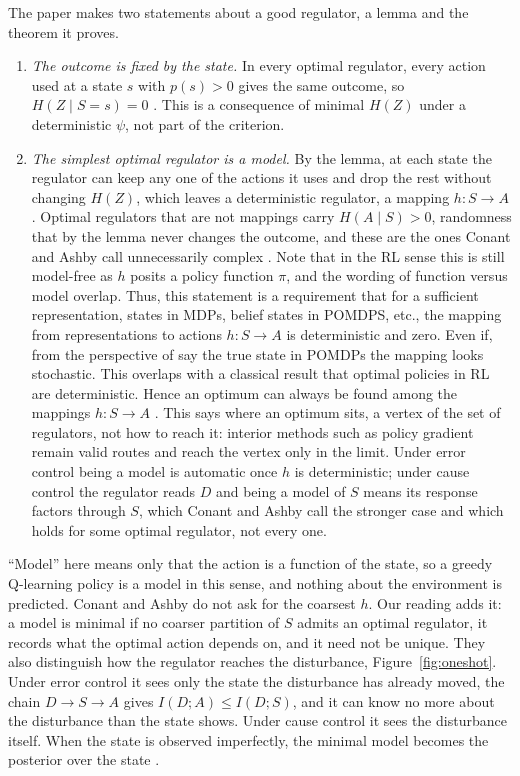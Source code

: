 The paper makes two statements about a good regulator, a lemma and the theorem it proves.
\begin{enumerate}
    \item \emph{The outcome is fixed by the state.} In every optimal regulator, every action used at a state $s$ with $p(s) > 0$ gives the same outcome, so $H(Z \mid S = s) = 0$ \citep[Lemma, p.~96]{Conant-good70}.
    This is a consequence of minimal $H(Z)$ under a deterministic $\psi$, not part of the criterion.
    \item \emph{The simplest optimal regulator is a model.} By the lemma, at each state the regulator can keep any one of the actions it uses and drop the rest without changing $H(Z)$, which leaves a deterministic regulator, a mapping $h\colon S \to A$ \citep[Theorem and proof, pp.~95--96]{Conant-good70}.
    Optimal regulators that are not mappings carry $H(A \mid S) > 0$, randomness that by the lemma never changes the outcome, and these are the ones Conant and Ashby call unnecessarily complex \citep[p.~96]{Conant-good70}.
    Note that in the RL sense this is still model-free as $h$ posits a policy function $\pi$, and the wording of function versus model overlap.
    Thus, this statement is a requirement that for a sufficient representation, states in MDPs, belief states in POMDPS, etc., the mapping from representations to actions $h: S \rightarrow A$ is deterministic and zero.
    Even if, from the perspective of say the true state in POMDPs the mapping looks stochastic. 
    This overlaps with a classical result that optimal policies in RL are deterministic.
    Hence an optimum can always be found among the mappings $h\colon S \to A$ \citep[p.~96]{Conant-good70}.
    This says where an optimum sits, a vertex of the set of regulators, not how to reach it: interior methods such as policy gradient remain valid routes and reach the vertex only in the limit.
    Under error control being a model is automatic once $h$ is deterministic; under cause control the regulator reads $D$ and being a model of $S$ means its response factors through $S$, which Conant and Ashby call the stronger case and which holds for some optimal regulator, not every one.
\end{enumerate}
``Model'' here means only that the action is a function of the state, so a greedy Q-learning policy is a model in this sense, and nothing about the environment is predicted.
Conant and Ashby do not ask for the coarsest $h$.
Our reading adds it: a model is minimal if no coarser partition of $S$ admits an optimal regulator, it records what the optimal action depends on, and it need not be unique.
They also distinguish how the regulator reaches the disturbance, Figure~\ref{fig:oneshot}.
Under error control it sees only the state the disturbance has already moved, the chain $D \to S \to A$ gives $I(D;A) \le I(D;S)$, and it can know no more about the disturbance than the state shows.
Under cause control it sees the disturbance itself.
When the state is observed imperfectly, the minimal model becomes the posterior over the state \citep{Wentworth-fixing21}.

